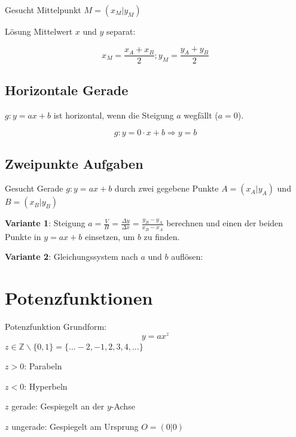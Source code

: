 \begin{multicols}{2}
Gesucht Mittelpunkt $M=(x_M|y_M)$

Lösung Mittelwert $x$ und $y$ separat:

$$x_M = \frac{x_A+x_B}2; y_M=\frac{y_A+y_B}2$$

\subsection*{Horizontale Gerade}

$g: y=ax+b$ ist horizontal, wenn die Steigung $a$ wegfällt ($a=0$).

$$g:  y=0\cdot{}x+b \Rightarrow y=b$$

\subsection*{Zweipunkte Aufgaben}
Gesucht Gerade $g: y=ax+b$ durch zwei gegebene Punkte $A=(x_A|y_A)$
und $B=(x_B|y_B)$

\textbf{Variante 1}: Steigung $a = \frac{V}H = \frac{\Delta y}{\Delta x}
= \frac{y_B-y_A}{x_B-x_A}$ berechnen und einen der beiden Punkte in
$y=ax+b$ einsetzen, um $b$ zu finden.

\textbf{Variante 2}: Gleichungssystem nach $a$ und $b$ auf\/lösen:

\hrulefill

\section*{Potenzfunktionen}

\begin{definition*}{Potenzfunktion}{}
Grundform:
$$y=ax^z$$
$z\in\mathbb{Z}\backslash\{0,1\} = \{...-2, -1, 2, 3, 4, ...\}$
\end{definition*}

$z>0$: Parabeln



$z<0$: Hyperbeln




$z$ gerade: Gespiegelt an der $y$-Achse

$z$ ungerade: Gespiegelt am Ursprung $O=(0|0)$


\end{multicols}
